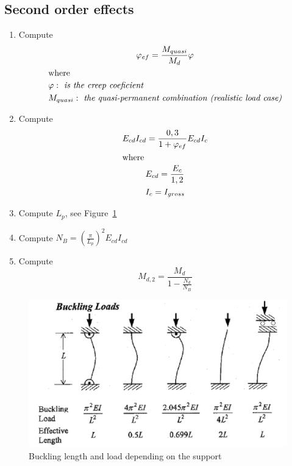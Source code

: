 \documentclass[landscape]{article}
\begin{document}
\begin{multicols*}{2}
\subsection{Second order effects} %
\label{sub:second_order_effects}
\begin{enumerate}
  \item Compute 
    \begin{gather}\label{eq:1.4}
        \varphi_{ef} = \frac{M_{quasi}}{M_d}\varphi\\
        \shortintertext{where}
        \begin{aligned}
          & \varphi: \emph{ is the creep coeficient}\\
          & M_{quasi}: \emph{ the quasi-permanent combination (realistic load case)}
        \end{aligned}\notag
    \end{gather}
  \item Compute 
    \begin{gather}\label{eq:1.4}
        E_{cd}I_{cd} = \frac{0,3}{1+ \varphi_{ef}}E_{cd}I_c\\
        \shortintertext{where}
        \begin{aligned}
          & E_{cd} = \frac{E_c}{1,2}\\
          & I_c = I_{gross}
        \end{aligned}\notag
    \end{gather}
  \item Compute $L_p$, see Figure~\ref{fig:buck}
  \item Compute $N_B = \left(\frac{\pi}{L_p}\right)^2E_{cd}I_{cd}$
  \item Compute
  \begin{equation}
    M_{d,2} = \frac{M_d}{1 - \frac{N_d}{N_B}}
  \end{equation}
\end{enumerate}
\begin{figure}[H]
    \centering
    \includegraphics[width=0.95\linewidth]{img/buckling}
    \caption{Buckling length and load depending on the support}
    \label{fig:buck}
\end{figure}


\end{multicols*}
\end{document}
